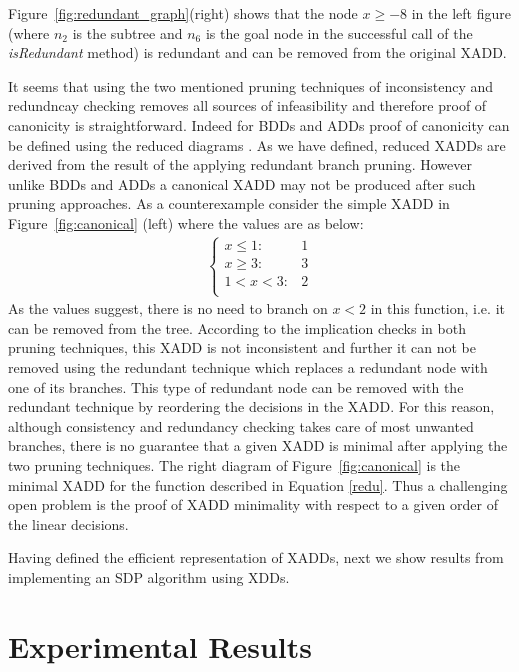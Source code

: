 \documentclass[twoside,11pt]{article}
\begin{document}
Figure~\ref{fig:redundant_graph}(right) shows that the node $x\geq -8$ in the left figure (where $n_2$ is the subtree and $n_6$ is the goal node in the successful call of the \emph{isRedundant} method) is redundant and can be removed from the original XADD. 

It seems that using the two mentioned pruning techniques of inconsistency and redundncay checking removes all sources of infeasibility and therefore proof of canonicity is straightforward. Indeed for BDDs and ADDs proof of canonicity can be defined using the reduced diagrams \cite{bryant}. 
As we have defined, reduced XADDs are derived from the result of the applying redundant branch pruning.  However unlike BDDs and ADDs a canonical XADD may not be produced after such pruning approaches. As a counterexample consider the simple XADD in  Figure~\ref{fig:canonical} (left) where the values are as below: 
\begin{align}
\label{redu}
	\begin{cases}
		x \leq 1 :& 1  \\
		x \geq 3 :&3\\
		1<x<3 :& 2\\
	\end{cases}
\end{align}
As the values suggest, there is no need to branch on $x<2$ in this function, i.e. it can be removed from the tree. According to the implication checks in both pruning techniques, this XADD is not inconsistent and further it can not be removed using the redundant technique which replaces a redundant node with one of its branches. This type of redundant node can be removed with the redundant technique by reordering the decisions in the XADD. For this reason, although consistency and redundancy checking takes care of most unwanted branches, there is no guarantee that a given XADD is minimal after applying the two pruning techniques. The right diagram of Figure~\ref{fig:canonical} is the minimal XADD  for the function described in Equation \ref{redu}. Thus a challenging open problem is the proof of XADD minimality with respect to a given order of the linear decisions. 

Having defined the efficient representation of XADDs, next we show results from implementing an SDP algorithm using XDDs.

\section{Experimental Results} \label{results}
\end{document}
